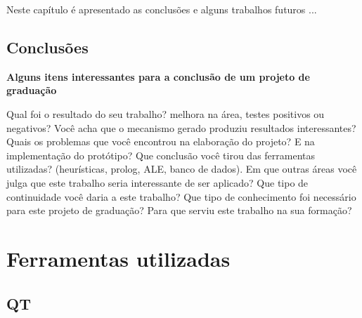 \documentclass[brazil]{abnt}
\begin{document}
Neste capítulo é apresentado as conclusões e alguns trabalhos futuros
...
\newpage


\section{Conclusões}

{\bf Alguns itens interessantes para a conclusão de um projeto de graduação}

Qual foi o resultado do seu trabalho? melhora na área, testes positivos ou negativos?
Você acha que o mecanismo gerado produziu resultados interessantes?
Quais os problemas que você encontrou na elaboração do projeto?
E na implementação do protótipo?
Que conclusão você tirou das ferramentas utilizadas? (heurísticas, prolog, ALE, banco de dados).
Em que outras áreas você julga que este trabalho seria interessante de ser aplicado?
Que tipo de continuidade você daria a este trabalho?
Que tipo de conhecimento foi necessário para este projeto de graduação?
Para que serviu este trabalho na sua formação?






\anexo

\chapter{Ferramentas utilizadas}

\section{QT}
\end{document}
